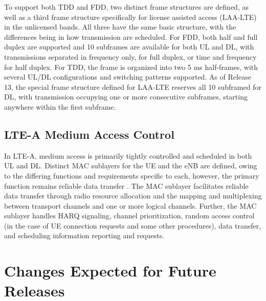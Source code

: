 To support both TDD and FDD, two distinct frame structures are defined, as well as a third frame structure specifically for license assisted access (LAA-LTE) in the unlicensed bands.  All three have the same basic structure, with the differences being in how transmission are scheduled.  For FDD, both half and full duplex are supported and 10 subframes are available for both UL and DL, with transmissions separated in frequency only, for full duplex, or time and frequency for half duplex.  For TDD, the frame is organized into two 5 ms half-frames, with several UL/DL configurations and switching patterns supported.  As of Release 13, the special frame structure defined for LAA-LTE reserves all 10 subframed for DL, with transmission occupying one or more consecutive subframes, starting anywhere within the first subframe.


\subsection{LTE-A Medium Access Control}
\label{lte-mac}
In LTE-A, medium access is primarily tightly controlled and scheduled in both UL and DL.  Distinct MAC sublayers for the UE and the eNB are defined, owing to the differing functions and requirements specific to each, however, the primary function remains reliable data transfer \cite{tr36321}.  The MAC sublayer facilitates reliable data transfer through radio resource allocation and the mapping and multiplexing between transport channels and one or more logical channels.  Further, the MAC sublayer handles HARQ signaling, channel prioritization, random access control (in the case of UE connection requests and some other procedures), data transfer, and scheduling information reporting and requests.  



\section {Changes Expected for Future Releases}
\label{fut-chnge}

